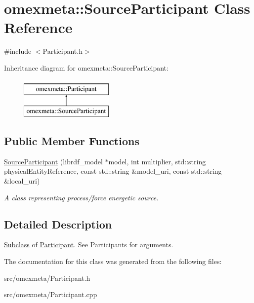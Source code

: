 \hypertarget{classomexmeta_1_1SourceParticipant}{}\section{omexmeta\+:\+:Source\+Participant Class Reference}
\label{classomexmeta_1_1SourceParticipant}


{\ttfamily \#include $<$Participant.\+h$>$}

Inheritance diagram for omexmeta\+:\+:Source\+Participant\+:\begin{figure}[H]
\begin{center}
\leavevmode
\includegraphics[height=2.000000cm]{classomexmeta_1_1SourceParticipant}
\end{center}
\end{figure}
\subsection*{Public Member Functions}
\begin{DoxyCompactItemize}
\item 
\mbox{\label{classomexmeta_1_1SourceParticipant_a84b77b854e235cc9e0cb8da2b6a2cee5}} 
\hyperlink{classomexmeta_1_1SourceParticipant_a84b77b854e235cc9e0cb8da2b6a2cee5}{Source\+Participant} (librdf\+\_\+model $\ast$model, int multiplier, std\+::string physical\+Entity\+Reference, const std\+::string \&model\+\_\+uri, const std\+::string \&local\+\_\+uri)
\begin{DoxyCompactList}\small\item\em A class representing process/force energetic source. \end{DoxyCompactList}\end{DoxyCompactItemize}


\subsection{Detailed Description}
\hyperlink{classSubclass}{Subclass} of \hyperlink{classomexmeta_1_1Participant}{Participant}. See Participants for arguments. 

The documentation for this class was generated from the following files\+:\begin{DoxyCompactItemize}
\item 
src/omexmeta/Participant.\+h\item 
src/omexmeta/Participant.\+cpp\end{DoxyCompactItemize}
